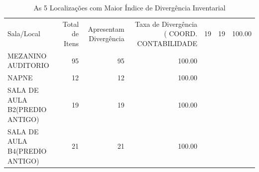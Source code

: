 \begin{table}
\caption{As 5 Localizações com Maior Índice de Divergência Inventarial}
\label{tab:divergencias_loc}
\begin{tabular}{lrrr}
\toprule
Sala/Local & Total de Itens & Apresentam Divergência & Taxa de Divergência (%
\midrule
COORD. CONTABILIDADE & 19 & 19 & 100.00 \\
MEZANINO AUDITORIO & 95 & 95 & 100.00 \\
NAPNE & 12 & 12 & 100.00 \\
SALA DE AULA B2(PREDIO ANTIGO) & 19 & 19 & 100.00 \\
SALA DE AULA B4(PREDIO ANTIGO) & 21 & 21 & 100.00 \\
\bottomrule
\end{tabular}
\end{table}
